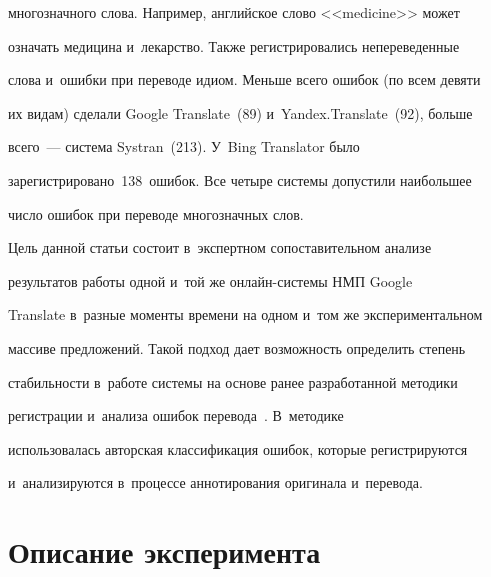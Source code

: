 многозначного слова. Например, английское слово <<medicine>> может 


означать медицина и~лекарство. Также регистрировались непереведенные 


слова и~ошибки при переводе идиом. Меньше всего ошибок (по всем девяти 


их видам) сделали Google Translate~(89) и~Yandex.Translate~(92), больше 


всего~--- система Systran~(213). У~Bing Translator было 


зарегистрировано~138~ошибок. Все четыре сис\-те\-мы допустили наибольшее 


число ошибок при переводе многозначных слов.


{





}


   


   Цель данной статьи состоит в~экспертном сопоставительном анализе 


результатов работы одной и~той же он\-лайн-сис\-те\-мы НМП Google 


Translate в~разные моменты времени на одном и~том же экспериментальном 


массиве предложений. Такой подход дает воз\-мож\-ность определить степень 


ста\-биль\-ности в~работе сис\-те\-мы на основе ранее разработанной методики 


регистрации и~анализа ошибок перевода~\cite{6-ez}. В~методике 


использовалась авторская классификация ошибок, которые ре\-гист\-ри\-ру\-ют\-ся 


и~анализируются в~процессе аннотирования оригинала и~перевода.





\vspace*{-6pt}





\section{Описание эксперимента}





\vspace*{-6pt}





